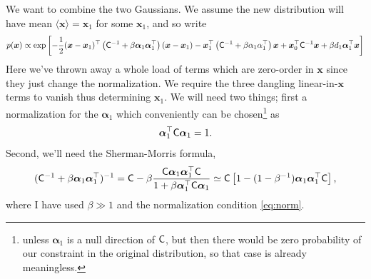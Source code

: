 \documentclass[11pt,a4paper,preprint]{aastex}
\newcommand{\bmath}[1]{\ensuremath{\bm{#1}}}
\renewcommand{\vec}[1]{\bmath{#1}}
\newcommand{\tens}[1]{{\bf \sf #1}}
\begin{document}
We want to combine the two Gaussians. We assume the new distribution
will have mean $\langle \vec{x} \rangle = \vec{x}_1$ for some
$\vec{x}_1$, and so write
\begin{equation}
p(\vec{x}) \propto \exp \left[-\frac{1}{2} (\vec{x} -
  \vec{x}_1)^{\top} \left(\tens{C}^{-1} + \beta \vec{\alpha}_1
    \vec{\alpha}_1^{\top} \right) (\vec{x}-\vec{x}_1) -
  \vec{x}_1^{\top} \left(\tens{C}^{-1} + \beta \alpha_1
    \alpha_1^{\top} \right) \vec{x} +
  \vec{x}_0^{\top}\tens{C}^{-1}\vec{x} + \beta d_1
  \vec{\alpha}_1^{\top} \vec{x}  \right]
\end{equation}
Here we've thrown away a whole load of terms which are zero-order in
$\vec{x}$ since they just change the normalization. We require the
three dangling linear-in-$\vec{x}$ terms to vanish thus determining
$\vec{x}_1$. We will need two things; first a normalization for the $\vec{\alpha}_1$ which conveniently can
be chosen\footnote{unless $\vec{\alpha}_1$ is a null direction of
  $\tens{C}$, but then there would be zero probability of our
  constraint in the original distribution, so that case is already meaningless. } as
\begin{equation}
\vec{\alpha}_1^{\top} \tens{C} \vec{\alpha}_1 = 1\textrm{.}\label{eq:norm}
\end{equation}
Second, we'll need the Sherman-Morris formula,
\begin{equation}
(\tens{C}^{-1} + \beta \vec{\alpha}_1 \vec{\alpha}_1^{\top})^{-1} =\tens{C} - \beta \frac{\tens{C} \vec{\alpha}_1 \vec{\alpha}_1^{\top}
  \tens{C}}{1+\beta \vec{\alpha}_1^{\top} \tens{C} \vec{\alpha}_1}
\simeq \tens{C} \left[ 1-(1-\beta^{-1}) \vec{\alpha}_1
  \vec{\alpha}_1^{\top} \tens{C} \right] \textrm{,}
\end{equation}
where I have used $\beta \gg 1$ and the normalization condition
\eqref{eq:norm}.
\end{document}

